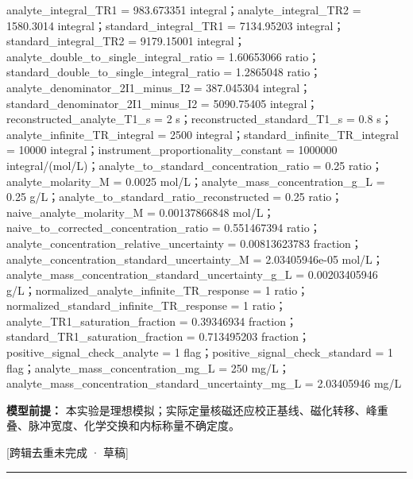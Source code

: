 \documentclass[UTF8,11pt,a4paper]{ctexart}
\begin{document}
analyte\_integral\_TR1 = 983.673351 integral；analyte\_integral\_TR2 = 1580.3014 integral；standard\_integral\_TR1 = 7134.95203 integral；standard\_integral\_TR2 = 9179.15001 integral；analyte\_double\_to\_single\_integral\_ratio = 1.60653066 ratio；standard\_double\_to\_single\_integral\_ratio = 1.2865048 ratio；analyte\_denominator\_2I1\_minus\_I2 = 387.045304 integral；standard\_denominator\_2I1\_minus\_I2 = 5090.75405 integral；reconstructed\_analyte\_T1\_s = 2 s；reconstructed\_standard\_T1\_s = 0.8 s；analyte\_infinite\_TR\_integral = 2500 integral；standard\_infinite\_TR\_integral = 10000 integral；instrument\_proportionality\_constant = 1000000 integral/(mol/L)；analyte\_to\_standard\_concentration\_ratio = 0.25 ratio；analyte\_molarity\_M = 0.0025 mol/L；analyte\_mass\_concentration\_g\_L = 0.25 g/L；analyte\_to\_standard\_ratio\_reconstructed = 0.25 ratio；naive\_analyte\_molarity\_M = 0.00137866848 mol/L；naive\_to\_corrected\_concentration\_ratio = 0.551467394 ratio；analyte\_concentration\_relative\_uncertainty = 0.00813623783 fraction；analyte\_concentration\_standard\_uncertainty\_M = 2.03405946e-05 mol/L；analyte\_mass\_concentration\_standard\_uncertainty\_g\_L = 0.00203405946 g/L；normalized\_analyte\_infinite\_TR\_response = 1 ratio；normalized\_standard\_infinite\_TR\_response = 1 ratio；analyte\_TR1\_saturation\_fraction = 0.39346934 fraction；standard\_TR1\_saturation\_fraction = 0.713495203 fraction；positive\_signal\_check\_analyte = 1 flag；positive\_signal\_check\_standard = 1 flag；analyte\_mass\_concentration\_mg\_L = 250 mg/L；analyte\_mass\_concentration\_standard\_uncertainty\_mg\_L = 2.03405946 mg/L\par
\noindent\textbf{模型前提：}
本实验是理想模拟；实际定量核磁还应校正基线、磁化转移、峰重叠、脉冲宽度、化学交换和内标称量不确定度。\par
\noindent\textcolor{red!65!black}{[跨辑去重未完成 · 草稿]} \par
\medskip\hrule\medskip
{}
\end{document}
